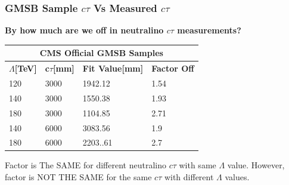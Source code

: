 \documentclass{beamer}
\begin{document}
\begin{frame}
\frametitle{GMSB Sample $c\tau$ Vs Measured $c\tau$}
\begin{LARGE}  
  \textbf{By how much are we off in  neutralino $c\tau$ measurements?}
    \end{LARGE}
\begin{table}
\begin{minipage}[b]{1.0\linewidth}
\centering
\begin{tabular}{|l||l||l||l|}
  \hline
  \multicolumn{4}{|c|}{\bfseries{CMS Official GMSB Samples}} \\
  \hline 
  \bfseries{$\Lambda$[TeV]} & \bfseries{c$\tau$[mm]} & \bfseries{Fit Value[mm]} &\bfseries{Factor Off} \\
\hline
120 & 3000 & 1942.12 & 1.54 \\
140 & 3000 & 1550.38 & 1.93 \\
180 & 3000 & 1104.85 & 2.71 \\
\hline
\hline
140 & 6000 & 3083.56  & 1.9 \\
180 & 6000 & 2203..61  & 2.7 \\
\hline
  \end{tabular}
  \end{minipage}
\end{table}
\vspace{-0.5cm}

Factor is \alert{The SAME} for different neutralino $c\tau$ with same $\Lambda$ value. However, factor is \alert{NOT THE SAME} for the same $c\tau$ with different $\Lambda$ values.

\end{frame}
\end{document}
